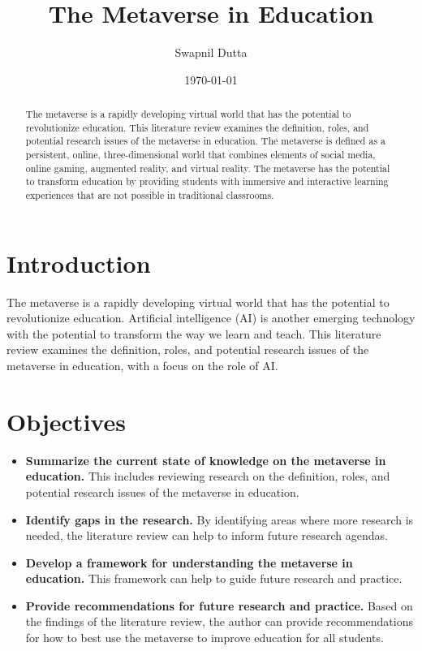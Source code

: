 \documentclass[12pt]{extarticle}
\title{The Metaverse in Education}
\author{Swapnil Dutta}
\date{\today}
\begin{document}
\maketitle

\begin{abstract}
The metaverse is a rapidly developing virtual world that has the potential to revolutionize education. This literature review examines the definition, roles, and potential research issues of the metaverse in education. The metaverse is defined as a persistent, online, three-dimensional world that combines elements of social media, online gaming, augmented reality, and virtual reality. The metaverse has the potential to transform education by providing students with immersive and interactive learning experiences that are not possible in traditional classrooms.
\end{abstract}

\section{Introduction}
The metaverse is a rapidly developing virtual world that has the potential to revolutionize education. Artificial intelligence (AI) is another emerging technology with the potential to transform the way we learn and teach.
This literature review examines the definition, roles, and potential research issues of the metaverse in education, with a focus on the role of AI.

\section{Objectives}
\begin{itemize}

    \item \textbf{Summarize the current state of knowledge on the metaverse in education.} This includes reviewing research on the definition, roles, and potential research issues of the metaverse in education.
    \item \textbf{Identify gaps in the research.} By identifying areas where more research is needed, the literature review can help to inform future research agendas.
    \item \textbf{Develop a framework for understanding the metaverse in education.} This framework can help to guide future research and practice.
    \item \textbf{Provide recommendations for future research and practice.} Based on the findings of the literature review, the author can provide recommendations for how to best use the metaverse to improve education for all students.

\end{itemize}
\end{document}
